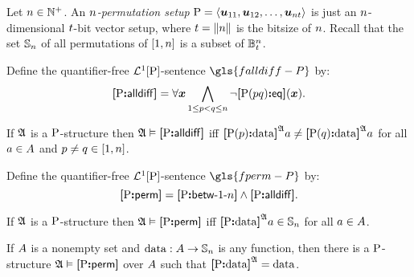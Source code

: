Let $\nn \in \pNats$. An \emph{$\nn$-permutation setup} 
$\PS = \seq{\suu{11}, \suu{12}, \dots, \suu{\nn\tbit}}$ is just an
$\nn$-dimensional $\tbit$-bit vector setup, where $\tbit = \bsz{\nn}$ is the
bitsize of $\nn$.
Recall that the set $\Perms\nn$ of all permutations of $[1, \nn]$ is a subset
of $\ntBitnums\nn\tbit$.

\begin{definition}
Define the quantifier-free $\vFoF1\PS$-sentence $\gls{falldiff-P}$ by:
\[
  \falldiff\PS = \forall\xx \bigwedge_{1 \leq \posp < \posq \leq \nn}
  \lnot\feqP\PS\posp\posq(\xx).
\]
\end{definition}
If $\StrA$ is a $\PS$-structure then $\StrA \vDash \falldiff\PS$ iff
$\data{\PSp\posp}\StrA\ea \neq \data{\PSp\posq}\StrA\ea$
for all $\ea \in \domA$ and $\posp \neq \posq \in [1, \nn]$.

\begin{definition}
Define the quantifier-free $\vFoF1\PS$-sentence $\gls{fperm-P}$ by:
\[
  \fperm\PS = \fbetw\PS1\nn \land \falldiff\PS.
\]
\end{definition}
If $\StrA$ is a $\PS$-structure then $\StrA \vDash \fperm\PS$ iff
$\data\PS\StrA\ea \in \Perms\nn$ for all $\ea \in \domA$.

If $\domA$ is a nonempty set and $\dataOP : \domA \to \Perms\nn$ is any
function, then there is a $\PS$-structure $\StrA \vDash \fperm\PS$ over $\domA$
such that $\data\PS\StrA = \dataOP$.